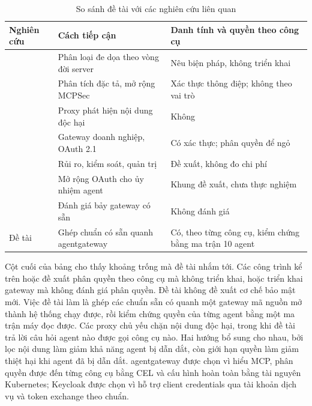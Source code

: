 \begin{table}[H]\centering\caption{So sánh đề tài với các nghiên cứu liên quan}\label{tab:ch3-related}
{\singlespacing\renewcommand{\arraystretch}{1.2}\small
\begin{tabularx}{\textwidth}{|>{\raggedright\arraybackslash}p{3.3cm}|>{\raggedright\arraybackslash}X|>{\raggedright\arraybackslash}p{4.6cm}|}\hline
\textbf{Nghiên cứu} & \textbf{Cách tiếp cận} & \textbf{Danh tính và quyền theo công cụ} \\ \hline
\textcite{hou2025mcp} & Phân loại đe dọa theo vòng đời server & Nêu biện pháp, không triển khai \\ \hline
\textcite{breakingmcp} & Phân tích đặc tả, mở rộng MCPSec & Xác thực thông điệp; không theo vai trò \\ \hline
\textcite{mcpguard} & Proxy phát hiện nội dung độc hại & Không \\ \hline
\textcite{securemcpgw} & Gateway doanh nghiệp, OAuth 2.1 & Có xác thực; phân quyền để ngỏ \\ \hline
\textcite{securingmcp} & Rủi ro, kiểm soát, quản trị & Đề xuất, không đo chi phí \\ \hline
\textcite{south2025delegation} & Mở rộng OAuth cho ủy nhiệm agent & Khung đề xuất, chưa thực nghiệm \\ \hline
\textcite{gatewaybench} & Đánh giá bảy gateway có sẵn & Không đánh giá \\ \hline
Đề tài & Ghép chuẩn có sẵn quanh agentgateway & Có, theo từng công cụ, kiểm chứng bằng ma trận 10 agent \\ \hline
\end{tabularx}}\end{table}

Cột cuối của bảng cho thấy khoảng trống mà đề tài nhắm tới. Các công trình kể trên hoặc đề xuất phân quyền theo công cụ mà không triển khai, hoặc triển khai gateway mà không đánh giá phân quyền. Đề tài không đề xuất cơ chế bảo mật mới. Việc đề tài làm là ghép các chuẩn sẵn có quanh một gateway mã nguồn mở thành hệ thống chạy được, rồi kiểm chứng quyền của từng agent bằng một ma trận máy đọc được. Các proxy chủ yếu chặn nội dung độc hại, trong khi đề tài trả lời câu hỏi agent nào được gọi công cụ nào. Hai hướng bổ sung cho nhau, bởi lọc nội dung làm giảm khả năng agent bị dẫn dắt, còn giới hạn quyền làm giảm thiệt hại khi agent đã bị dẫn dắt. agentgateway được chọn vì hiểu MCP, phân quyền được đến từng công cụ bằng CEL và cấu hình hoàn toàn bằng tài nguyên Kubernetes; Keycloak được chọn vì hỗ trợ client credentials qua tài khoản dịch vụ và token exchange theo chuẩn.
